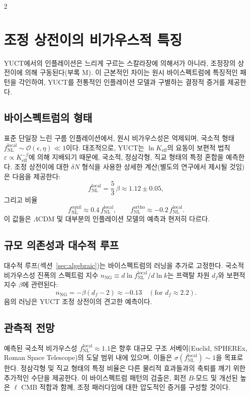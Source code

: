 \documentclass[11pt,a4paper]{article}
\begin{document}
\begin{multicols}{2}
		\section{조정 상전이의 비가우스적 특징}
		\label{sec:nongaussian}
		
		YUCT에서의 인플레이션은 느리게 구르는 스칼라장에 의해서가 아니라, 조정장의 상전이에 의해 구동된다(부록 M). 이 근본적인 차이는 원시 바이스펙트럼에 특징적인 패턴을 각인하여, YUCT를 전통적인 인플레이션 모델과 구별하는 결정적 증거를 제공한다.
		
		\subsection{바이스펙트럼의 형태}
		표준 단일장 느린 구름 인플레이션에서, 원시 비가우스성은 억제되며, 국소적 형태 $f_{\mathrm{NL}}^{\mathrm{local}} \sim \mathcal{O}(\epsilon,\eta) \ll 1$이다. 대조적으로, YUCT는 $\ln K_{\mathrm{eff}}$의 요동이 보편적 법칙 $\varepsilon \propto K_{\mathrm{eff}}^{-\beta}$에 의해 지배되기 때문에, 국소적, 정삼각형, 직교 형태의 특정 혼합을 예측한다. 조정 상전이에 대한 $\delta N$ 형식을 사용한 상세한 계산(별도의 연구에서 제시될 것임)은 다음을 제공한다:
		\begin{equation}
			f_{\mathrm{NL}}^{\mathrm{local}} = \frac{5}{3}\,\beta \approx 1.12 \pm 0.05,
		\end{equation}
		그리고 비율
		\begin{equation}
			f_{\mathrm{NL}}^{\mathrm{equil}} \approx 0.4\, f_{\mathrm{NL}}^{\mathrm{local}}, \qquad
			f_{\mathrm{NL}}^{\mathrm{ortho}} \approx -0.2\, f_{\mathrm{NL}}^{\mathrm{local}}.
		\end{equation}
		이 값들은 $\Lambda$CDM 및 대부분의 인플레이션 모델의 예측과 현저히 다르다.
		
		\subsection{규모 의존성과 대수적 루프}
		대수적 루프(섹션~\ref{sec:algebraic})는 바이스펙트럼의 러닝을 추가로 고정한다. 국소적 비가우스성 진폭의 스펙트럼 지수 $n_{\mathrm{NG}} \equiv d\ln f_{\mathrm{NL}}^{\mathrm{local}} / d\ln k$는 프랙탈 차원 $d_f$와 보편적 지수 $\beta$에 관련된다:
		\begin{equation}
			n_{\mathrm{NG}} = -\beta (d_f - 2) \approx -0.13 \quad (\text{for } d_f \approx 2.2).
		\end{equation}
		음의 러닝은 YUCT 조정 상전이의 견고한 예측이다.
		
		\subsection{관측적 전망}
		예측된 국소적 비가우스성 $f_{\mathrm{NL}}^{\mathrm{local}} \approx 1.1$은 향후 대규모 구조 서베이(Euclid, SPHEREx, Roman Space Telescope)의 도달 범위 내에 있으며, 이들은 $\sigma(f_{\mathrm{NL}}^{\mathrm{local}}) \sim 1$을 목표로 한다. 정삼각형 및 직교 형태의 특정 비율은 다른 물리적 효과들과의 축퇴를 깨기 위한 추가적인 수단을 제공한다. 이 바이스펙트럼 패턴의 검출은, 회전 $B$-모드 및 개선된 높은 $\ell$ CMB 적합과 함께, 조정 패러다임에 대한 압도적인 증거를 구성할 것이다.
		

\end{multicols}
\end{document}
